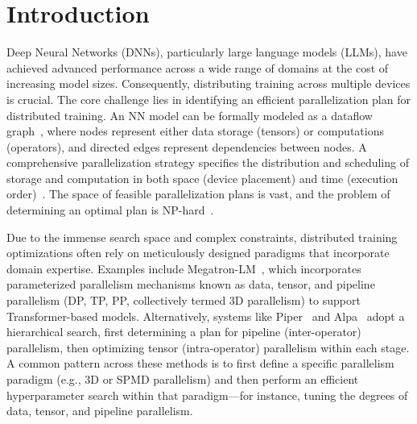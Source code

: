 \documentclass[letterpaper,twocolumn,10pt]{article}
\begin{document}
\section{Introduction}
\label{sec:intro}

Deep Neural Networks (DNNs), particularly large language models (LLMs), have achieved advanced performance across a wide range of domains at the cost of increasing model sizes. Consequently, distributing training across multiple devices is crucial. The core challenge lies in identifying an efficient parallelization plan for distributed training. An NN model can be formally modeled as a dataflow graph~\cite{lin2023songc}, where nodes represent either data storage (tensors) or computations (operators), and directed edges represent dependencies between nodes. A comprehensive parallelization strategy specifies the distribution and scheduling of storage and computation in both space (device placement) and time (execution order)~\cite{qiu2025moirai, huang2019yugong, lin2024nnscaler}. The space of feasible parallelization plans is vast, and the problem of determining an optimal plan is NP-hard~\cite{liu2024aceso}.

Due to the immense search space and complex constraints, distributed training optimizations often rely on meticulously designed paradigms that incorporate domain expertise. Examples include Megatron-LM~\cite{shoeybi2019megatron, narayanan2021efficient}, which incorporates parameterized parallelism mechanisms known as data, tensor, and pipeline parallelism (DP, TP, PP, collectively termed 3D parallelism) to support Transformer-based models. Alternatively, systems like Piper~\cite{tarnawski2021piper} and Alpa~\cite{zheng2022alpa} adopt a hierarchical search, first determining a plan for pipeline (inter-operator) parallelism, then optimizing tensor (intra-operator) parallelism within each stage. A common pattern across these methods is to first define a specific parallelism paradigm (e.g., 3D or SPMD parallelism) and then perform an efficient hyperparameter search within that paradigm—for instance, tuning the degrees of data, tensor, and pipeline parallelism.
\end{document}
